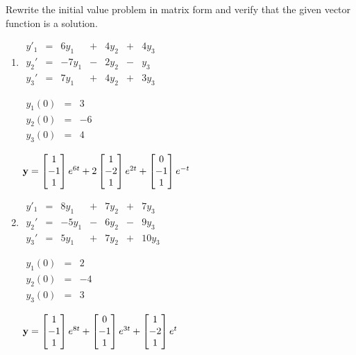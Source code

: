 \documentclass{ximera}
\begin{document}
\begin{problem}\label{exer:10.2.4}
Rewrite the initial value problem in matrix form and
 verify that the given vector function is a solution.

\begin{enumerate}
\item %
 $\begin{array}{ccccccc}
 y'_1&=&6y_1 &+& 4y_2& +& 4y_3 \\
y_2'&=&-7y_1 &-&2y_2& -& y_3\\
y_3'&=&7y_1& + &4y_2& +& 3y_3\end{array}$

$\begin{array}{ccc}y_1(0)&=&3\\
y_2(0)&=&-6\\ y_3(0)&=&4\end{array}$

${\bf
y}=\begin{bmatrix}1\\-1\\1\end{bmatrix}e^{6t}+2\begin{bmatrix}1\\-2\\1\end{bmatrix}e^{2t}+\begin{bmatrix}0\\-1\\1\end{bmatrix}e^{-t}$

\item %
 $\begin{array}{ccccccc}
 y'_1&=&8y_1& +& 7y_2& +&7y_3 \\
y_2'&=&-5y_1& -&6y_2 &-&9y_3\\
y_3'&=&5y_1& +& 7y_2& +&10y_3\end{array}$

$\begin{array}{ccc}y_1(0)&=&2\\
y_2(0)&=&-4\\ y_3(0)&=&3\end{array}$

${\bf
y}=\begin{bmatrix}1\\-1\\1\end{bmatrix}e^{8t}+\begin{bmatrix}0\\-1\\1\end{bmatrix}e^{3t}+\begin{bmatrix}1\\-2\\1\end{bmatrix}e^t$
\end{enumerate}
\end{problem}
\end{document}
